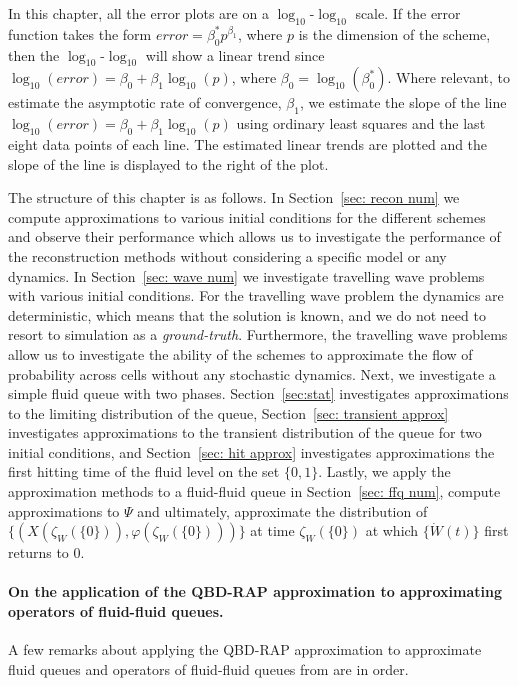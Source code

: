 In this chapter, all the error plots are on a \(\log_{10}\)-\(\log_{10}\) scale. If the error function takes the form \(error = \beta_0^* p^{\beta_1}\), where \(p\) is the dimension of the scheme, then the \(\log_{10}\)-\(\log_{10}\) will show a linear trend since \(\log_{10}(error) = \beta_0 + \beta_1 \log_{10}(p)\), where \(\beta_0=\log_{10}(\beta_0^*)\). Where relevant, to estimate the asymptotic rate of convergence, \(\beta_1\), we estimate the slope of the line \(\log_{10}(error) = \beta_0 + \beta_1 \log_{10}(p)\) using ordinary least squares and the last eight data points of each line. The estimated linear trends are plotted and the slope of the line is displayed to the right of the plot. 

The structure of this chapter is as follows. In Section~\ref{sec: recon num} we compute approximations to various initial conditions for the different schemes and observe their performance which allows us to investigate the performance of the reconstruction methods without considering a specific model or any dynamics. In Section~\ref{sec: wave num} we investigate travelling wave problems with various initial conditions. For the travelling wave problem the dynamics are deterministic, which means that the solution is known, and we do not need to resort to simulation as a \emph{ground-truth}. Furthermore, the travelling wave problems allow us to investigate the ability of the schemes to approximate the flow of probability across cells without any stochastic dynamics. Next, we investigate a simple fluid queue with two phases. Section~\ref{sec:stat} investigates approximations to the limiting distribution of the queue, Section~\ref{sec: transient approx} investigates approximations to the transient distribution of the queue for two initial conditions, and Section~\ref{sec: hit approx} investigates approximations the first hitting time of the fluid level on the set \(\{0,1\}\). Lastly, we apply the approximation methods to a fluid-fluid queue in Section~\ref{sec: ffq num}, compute approximations to \(\mathbb \Psi\) and ultimately, approximate the distribution of \(\{(X(\zeta_{W}(\{0\})),\varphi(\zeta_{W}(\{0\})))\}\) at time \(\zeta_{W}(\{0\})\) at which \(\{\dot W(t)\}\) first returns to \(0\). 


\paragraph{On the application of the QBD-RAP approximation to approximating operators of fluid-fluid queues.}
A few remarks about applying the QBD-RAP approximation to approximate fluid queues and operators of fluid-fluid queues from \cite{bo2014} are in order. 


